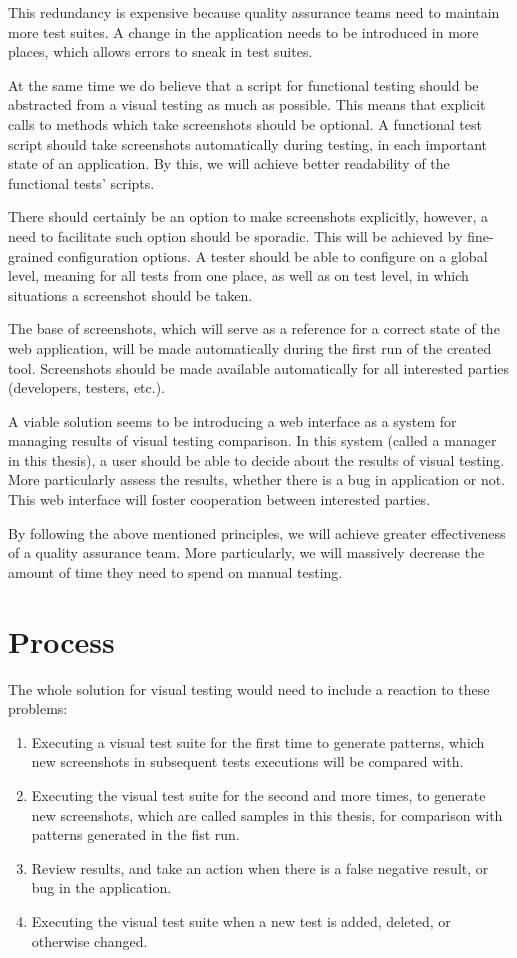 \documentclass[11pt,oneside,final]{fithesis2}
\begin{document}
  This redundancy is expensive because quality assurance teams need to maintain more test suites. A change in the application needs to be introduced in more places, which allows errors to
  sneak in test suites.
  
  At the same time we do believe that a script for functional testing should be abstracted from a visual testing as much as possible. This means that explicit calls to methods which 
  take screenshots should be optional. A functional test script should take screenshots automatically during testing, in each important state of an application. By this, we will achieve better
  readability of the functional tests' scripts.
  
  There should certainly be an option to make screenshots explicitly, however, a need to facilitate such option should be sporadic. This will be achieved by fine-grained configuration options.
  A tester should be able to configure on a global level, meaning for all tests from one place, as well as on test level, in which situations a screenshot should be taken.
  
  The base of screenshots, which will serve as a reference for a correct state of the web application, will be made automatically during the first run of the created tool. 
  Screenshots should be made available automatically for all interested parties (developers, testers, etc.).
  
  A viable solution seems to be introducing a web interface as a system for managing results of visual testing comparison. In this system (called a manager in this thesis), a user should be
  able to decide about the results of visual testing. More particularly assess the results, whether there is a bug in application or not. 
  This web interface will foster cooperation between interested parties.
  
  By following the above mentioned principles, we will achieve greater effectiveness of a quality assurance team. More particularly, we will massively decrease the amount of time they need to spend 
  on manual testing.
  
  \section{Process}
  \label{sec:process}
  The whole solution for visual testing would need to include a reaction to these problems:
  \begin{enumerate}
   \item Executing a visual test suite for the first time to generate patterns, which new screenshots in subsequent tests executions will be compared with.
   \item Executing the visual test suite for the second and more times, to generate new screenshots, which are called samples in this thesis, for comparison with patterns generated in the fist run.
   \item Review results, and take an action when there is a false negative result, or bug in the application.
   \item Executing the visual test suite when a new test is added, deleted, or otherwise changed.
  \end{enumerate}
\end{document}
